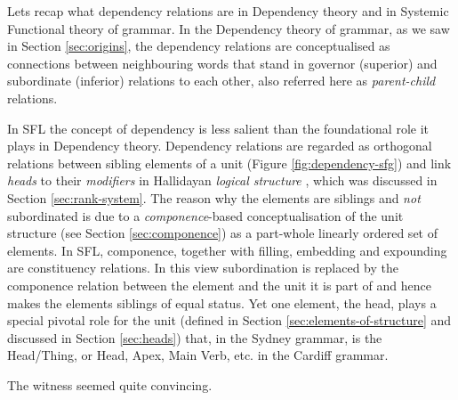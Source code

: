 
    Lets recap what dependency relations are in Dependency theory and in Systemic Functional theory of grammar. In the Dependency theory of grammar, as we saw in Section \ref{sec:origins}, the dependency relations are conceptualised as connections between neighbouring words that stand in governor (superior) and subordinate (inferior) relations to each other, also referred here as \textit{parent-child} relations. 

    In SFL the concept of dependency is less salient than the foundational role it plays in Dependency theory. Dependency relations are regarded as orthogonal relations between sibling elements of a unit (Figure \ref{fig:dependency-sfg}) and link \textit{heads} to their \textit{modifiers} in Hallidayan \textit{logical structure} \citep[388]{Halliday2013}, which was discussed in Section \ref{sec:rank-system}. The reason why the elements are siblings and \textit{not} subordinated is due to a \textit{componence}-based conceptualisation of the unit structure (see Section \ref{sec:componence}) as a part-whole linearly ordered set of elements. In SFL, componence, together with filling, embedding and expounding are constituency relations. In this view subordination is replaced by the componence relation between the element and the unit it is part of and hence makes the elements siblings of equal status. Yet one element, the head, plays a special pivotal role for the unit (defined in Section \ref{sec:elements-of-structure} and discussed in Section \ref{sec:heads}) that, in the Sydney grammar, is the Head/Thing, or Head, Apex, Main Verb, etc. in the Cardiff grammar.


    \begin{exe}
        \ex\label{ex:witness} The witness seemed quite convincing. 
    \end{exe}

